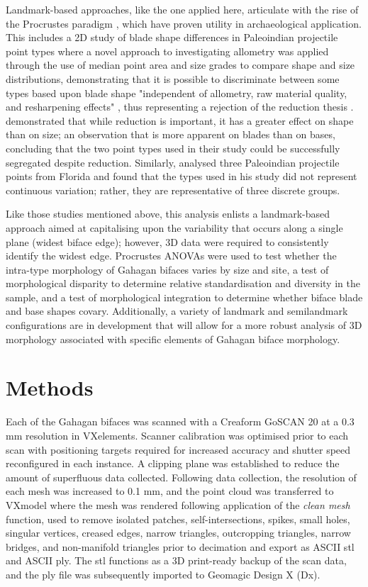 \documentclass[review]{elsarticle}
\begin{document}
Landmark-based approaches, like the one applied here, articulate with the rise of the Procrustes paradigm \citep[8]{RN1743}, which have proven utility in archaeological application. This includes a 2D study of blade shape differences in Paleoindian projectile point types where a novel approach to investigating allometry was applied through the use of median point area and size grades to compare shape and size distributions, demonstrating that it is possible to discriminate between some types based upon blade shape "independent of allometry, raw material quality, and resharpening effects" \citep[357]{RN1754}, thus representing a rejection of the reduction thesis \citep{RN11866}. \citet{RN4338x} demonstrated that while reduction is important, it has a greater effect on shape than on size; an observation that is more apparent on blades than on bases, concluding that the two point types used in their study could be successfully segregated despite reduction. Similarly, \citet{RN11528} analysed three Paleoindian projectile points from Florida and found that the types used in his study did not represent continuous variation; rather, they are representative of three discrete groups. 

Like those studies mentioned above, this analysis enlists a landmark-based approach aimed at capitalising upon the variability that occurs along a single plane (widest biface edge); however, 3D data were required to consistently identify the widest edge. Procrustes ANOVAs were used to test whether the intra-type morphology of Gahagan bifaces varies by size and site, a test of morphological disparity to determine relative standardisation and diversity in the sample, and a test of morphological integration to determine whether biface blade and base shapes covary. Additionally, a variety of landmark and semilandmark configurations are in development that will allow for a more robust analysis of 3D morphology associated with specific elements of Gahagan biface morphology.

\section{Methods}

Each of the Gahagan bifaces was scanned with a Creaform GoSCAN 20 at a 0.3 mm resolution in VXelements. Scanner calibration was optimised prior to each scan with positioning targets required for increased accuracy and shutter speed reconfigured in each instance. A clipping plane was established to reduce the amount of superfluous data collected. Following data collection, the resolution of each mesh was increased to 0.1 mm, and the point cloud was transferred to VXmodel where the mesh was rendered following application of the \textit{clean mesh} function, used to remove isolated patches, self-intersections, spikes, small holes, singular vertices, creased edges, narrow triangles, outcropping triangles, narrow bridges, and non-manifold triangles prior to decimation and export as ASCII stl and ASCII ply. The stl functions as a 3D print-ready backup of the scan data, and the ply file was subsequently imported to Geomagic Design X (Dx).
\end{document}
